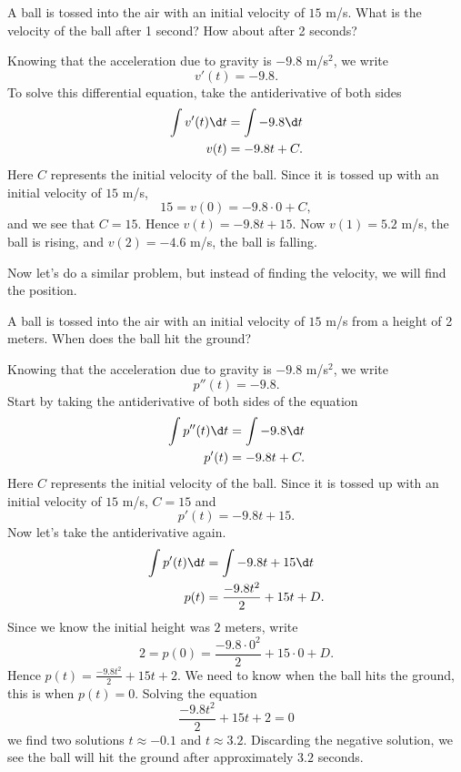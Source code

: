 \begin{example}
A ball is tossed into the air with an initial velocity of $15$
m/s. What is the velocity of the ball after 1 second? How about after
2 seconds?
\end{example}

\begin{solution}
Knowing that the acceleration due to gravity is $-9.8$ m/s$^2$, we write
\[
v'(t) = -9.8.
\]
To solve this differential equation, take the antiderivative of both sides
\begin{align*}
\int v'(t) \d t &= \int -9.8 \d t\\
v(t) &= -9.8t + C.
\end{align*}
Here $C$ represents the initial velocity of the ball. Since it is
tossed up with an initial velocity of $15$ m/s, 
\[
15 = v(0) = -9.8\cdot 0 + C,
\]
and we see that $C=15$. Hence $v(t) = -9.8t + 15$. Now $v(1) = 5.2$
m/s, the ball is rising, and $v(2) = -4.6$ m/s, the ball is falling.
\end{solution}

Now let's do a similar problem, but instead of finding the velocity,
we will find the position.

\begin{example}
A ball is tossed into the air with an initial velocity of $15$ m/s
from a height of 2 meters. When does the ball hit the ground?
\end{example}

\begin{solution}
Knowing that the acceleration due to gravity is $-9.8$ m/s$^2$, we write
\[
p''(t) = -9.8.
\]
Start by taking the antiderivative of both sides of the equation
\begin{align*}
\int p''(t) \d t &= \int -9.8 \d t\\
p'(t) &= -9.8t + C.
\end{align*}
Here $C$ represents the initial velocity of the ball. Since it is
tossed up with an initial velocity of $15$ m/s, $C = 15$ and 
\[
p'(t) = -9.8t + 15.
\]
Now let's take the antiderivative again. 
\begin{align*}
\int p'(t) \d t &= \int -9.8t +15\d t\\
p(t) &= \frac{-9.8t^2}{2} + 15t + D.
\end{align*}
Since we know the initial height was $2$ meters, write
\[
2 = p(0) =  \frac{-9.8\cdot 0^2}{2} + 15\cdot 0 + D.
\]
Hence $p(t) = \frac{-9.8t^2}{2} + 15t + 2$. We need to know when the
ball hits the ground, this is when $p(t)=0$. Solving the equation
\[
\frac{-9.8t^2}{2} + 15t + 2 = 0
\]
we find two solutions $t\approx -0.1$ and $t\approx 3.2$. Discarding
the negative solution, we see the ball will hit the ground after
approximately $3.2$ seconds.
\end{solution}


